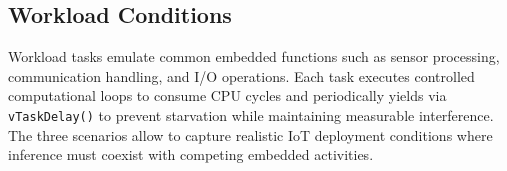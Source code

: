 \documentclass[conference]{IEEEtran}
\begin{document}
\subsection{Workload Conditions}
Workload tasks emulate common embedded functions such as sensor processing, communication handling, and I/O operations. 
Each task executes controlled computational loops to consume CPU cycles and periodically yields via \texttt{vTaskDelay()} to prevent starvation while maintaining measurable interference. The three scenarios allow to capture realistic IoT deployment conditions where inference must coexist with competing embedded activities.

\end{document}
